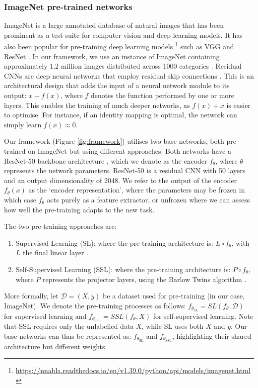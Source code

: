 \documentclass[a4paper,fleqn]{cas-dc}
\begin{document}
\subsubsection{ImageNet pre-trained networks}
\label{sec:ImageNet_pre-trained_networks}
ImageNet is a large annotated database of natural images \cite{ImageNet_2023} that has been prominent as a test suite for computer vision and deep learning models. It has also been popular for pre-training deep learning models \footnote{\url{https://nnabla.readthedocs.io/en/v1.39.0/python/api/models/imagenet.html}} such as VGG \cite{simonyan2014very} and ResNet   \cite{wu2019wider}.  In our framework, we use an instance of ImageNet containing approximately 1.2 million images distributed across 1000 categories \cite{russakovsky2015ImageNet,Deng2009}. Residual CNNs are deep neural networks that employ residual skip connections \cite{he2016deep}. This is an architectural design that adds the input of a neural network module to its output: $x + f(x)$, where $f$ denotes the function performed by one or more layers. This enables the training of much deeper networks, as $f(x)+x$ is easier to optimise. For instance, if an identity mapping is optimal, the network can simply learn $f(x) \approx 0$.

Our framework (Figure \ref{fig:framework}) utilises two base networks, both pre-trained on ImageNet but using different approaches. Both networks have a ResNet-50 backbone architecture \cite{he2016deep}, which we denote as the encoder $f_\theta$, where $\theta$ represents the network parameters. ResNet-50 is a residual CNN with 50 layers and an output dimensionality of 2048. We refer to the output of the encoder $f_{\theta}(x)$ as the `encoder representation', where the parameters may be frozen in which case $f_{\theta}$ acts purely as a feature extractor, or unfrozen where we can assess how well the pre-training adapts to the new task.

The two pre-training approaches are:
\begin{enumerate}
\item Supervised Learning (SL): where the pre-training architecture is: $L \circ f_\theta$, with $L$ the final linear layer \cite{torchvision_resnet50}.
\item Self-Supervised Learning (SSL): where the pre-training architecture is: $P \circ f_\theta$, where $P$ represents the projector layers, using the Barlow Twins algorithm \cite{barlowtwins}.
\end{enumerate}

More formally, let $\mathcal{D}=(X, y)$ be a dataset used for pre-training (in our case, ImageNet). We denote the pre-training processes as follows:
$f_{\theta_{\scriptscriptstyle\text{SL}}} = SL(f_\theta, \mathcal{D})$ for supervised learning and $f_{\theta_{\scriptscriptstyle\text{SSL}}} = SSL(f_\theta, X)$ for self-supervised learning. Note that SSL requires only the unlabelled data $X$, while SL uses both $X$ and $y$. Our base networks can thus be represented as: $f_{\theta_{\scriptscriptstyle\text{SL}}}$ and $f_{\theta_{\scriptscriptstyle\text{SSL}}}$, highlighting their shared architecture but different weights.
\end{document}
